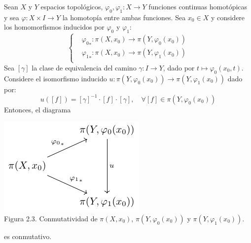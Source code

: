 \documentclass[12pt]{report}
\theoremstyle{largebreak}
\newcommand\cf[3]{\ensuremath{#1:#2\rightarrow#3}}
\begin{document}
    \begin{theor}
        Sean $X$ y $Y$ espacios topológicos, $\cf{\varphi_0,\varphi_1}{X}{Y}$ funciones continuas homotópicas y sea $\cf{\varphi}{X\times I}{Y}$ la homotopía entre ambas funciones. Sea $x_0\in X$ y considere los homomorfismos inducidos por $\varphi_0$ y $\varphi_1$:
        \begin{equation*}
            \left\{
            \begin{split}
                &\cf{{\varphi_0}_*}{\pi(X,x_0)}{\pi(Y,\varphi_0(x_0))}\\
                &\cf{{\varphi_1}_* }{\pi(X,x_0)}{\pi(Y,\varphi_1(x_0))}\\
            \end{split}
            \right.
        \end{equation*}
        Sea $[\gamma]$ la clase de equivalencia del camino $\cf{\gamma}{I}{Y}$, dado por $t\mapsto\varphi_0(x_0,t)$. Considere el isomorfismo inducido $\cf{u}{\pi(Y,\varphi_0(x_0))}{\pi(Y,\varphi_1(x_0))}$ dado por:
        \begin{equation*}
            u([f])=[\gamma]^{-1}\cdot[f]\cdot[\gamma],\quad\forall [f]\in\pi(Y,\varphi_0(x_0))
        \end{equation*}
        Entonces, el diagrama

        \begin{minipage}{\textwidth}
            \begin{center}
                \includegraphics[scale=1.5]{images/fig_4.pdf}\\
                Figura 2.3. Conmutatividad de $\pi(X,x_0)$, $\pi(Y,\varphi_0(x_0))$ y $\pi(Y,\varphi_1(x_0))$.
            \end{center}
        \end{minipage}

        es conmutativo.
    \end{theor}
\end{document}
